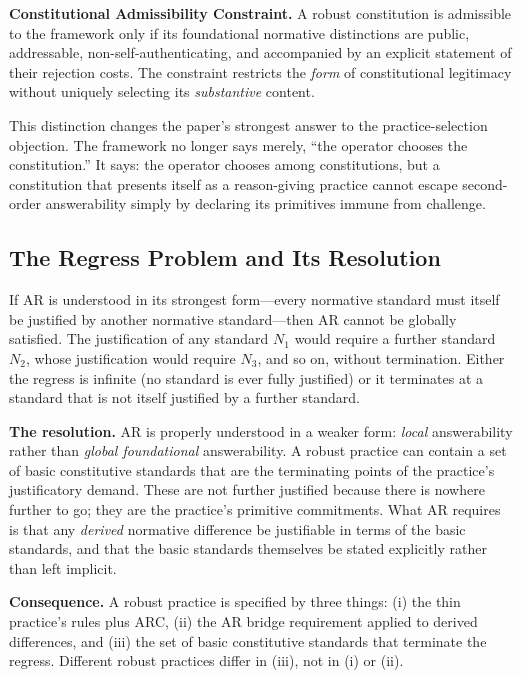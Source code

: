 \documentclass[11pt]{article}
\begin{document}
\begin{paperbox}
\textbf{Constitutional Admissibility Constraint.} A robust constitution is admissible to the framework only if its foundational normative distinctions are public, addressable, non-self-authenticating, and accompanied by an explicit statement of their rejection costs. The constraint restricts the \emph{form} of constitutional legitimacy without uniquely selecting its \emph{substantive} content.
\end{paperbox}

This distinction changes the paper's strongest answer to the practice-selection objection. The framework no longer says merely, ``the operator chooses the constitution.'' It says: the operator chooses among constitutions, but a constitution that presents itself as a reason-giving practice cannot escape second-order answerability simply by declaring its primitives immune from challenge.

\subsection{The Regress Problem and Its Resolution}
If AR is understood in its strongest form---every normative standard must itself be justified by another normative standard---then AR cannot be globally satisfied. The justification of any standard $N_1$ would require a further standard $N_2$, whose justification would require $N_3$, and so on, without termination. Either the regress is infinite (no standard is ever fully justified) or it terminates at a standard that is not itself justified by a further standard.

\textbf{The resolution.} AR is properly understood in a weaker form: \emph{local} answerability rather than \emph{global foundational} answerability. A robust practice can contain a set of basic constitutive standards that are the terminating points of the practice's justificatory demand. These are not further justified because there is nowhere further to go; they are the practice's primitive commitments. What AR requires is that any \emph{derived} normative difference be justifiable in terms of the basic standards, and that the basic standards themselves be stated explicitly rather than left implicit.

\textbf{Consequence.} A robust practice is specified by three things: (i) the thin practice's rules plus ARC, (ii) the AR bridge requirement applied to derived differences, and (iii) the set of basic constitutive standards that terminate the regress. Different robust practices differ in (iii), not in (i) or (ii).
\end{document}
